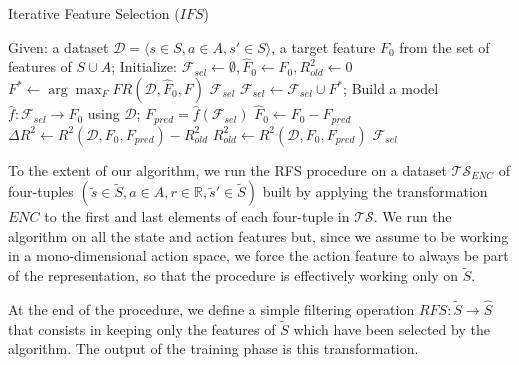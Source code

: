\begin{algorithm}
    \caption{Iterative Feature Selection ($IFS$)}
    \label{alg:IFS}
    \begin{algorithmic}
	\STATE Given: a dataset $\mathcal{D} = {\langle s \in S, a \in A, s' \in S \rangle}$, a target feature $F_0$ from the set of features of $S \cup A$;
	\STATE Initialize: $\mathcal{F}_{sel} \leftarrow \emptyset, \hat{F}_0 \leftarrow F_0, R^2_{old} \leftarrow 0$
	\REPEAT
	    \STATE $F^* \leftarrow \arg\max_F FR(\mathcal{D}, \hat{F}_0, F)$
		\RETURN $\mathcal{F}_{sel}$
	    \ENDIF
	    \STATE $\mathcal{F}_{sel} \leftarrow \mathcal{F}_{sel} \cup F^*$;
	    \STATE Build a model $\hat{f}: \mathcal{F}_{sel} \rightarrow F_0$ using $\mathcal{D}$;
	    \STATE $F_{pred} = \hat{f}(\mathcal{F}_{sel})$
	    \STATE $\hat{F}_0 \leftarrow F_0 - F_{pred}$
	    \STATE $\Delta R^2 \leftarrow R^2(\mathcal{D}, F_0, F_{pred}) - R^2_{old}$
	    \STATE $R^2_{old} \leftarrow R^2 (\mathcal{D}, F_0, F_{pred})$
	\RETURN $\mathcal{F}_{sel}$	
    \end{algorithmic}
\end{algorithm}
%

To the extent of our algorithm, we run the RFS procedure on a dataset 
$\mathcal{TS}_{ENC}$ of four-tuples 
$(\tilde{s} \in \tilde{S}, a \in A, r \in \mathbb{R}, \tilde{s}' \in \tilde{S})$
built by applying the transformation $ENC$ to the first and last elements of 
each four-tuple in $\mathcal{TS}$.
We run the algorithm on all the state and action features but, since we 
assume to be working in a mono-dimensional action space, we force the action 
feature to always be part of the representation, so that the procedure is 
effectively working only on $\tilde{S}$.

At the end of the procedure, we define a simple filtering operation 
$RFS: \tilde{S} \rightarrow \hat{S}$ that consists in keeping only the features
of $\tilde{S}$ which have been selected by the algorithm. The output of the 
training phase is this transformation. 


